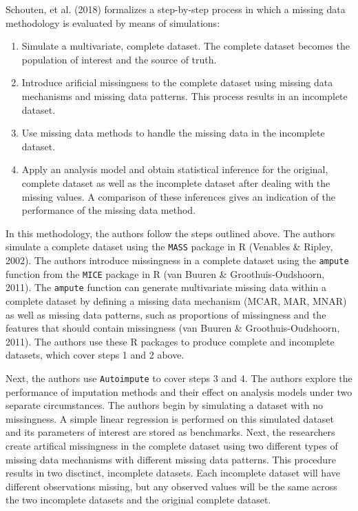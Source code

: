 \documentclass[12pt,oneside]{chicagocapstone}
\providecommand{\tightlist}{%
  \setlength{\itemsep}{0pt}\setlength{\parskip}{0pt}}
\begin{document}
Schouten, et al. (2018) formalizes a step-by-step process in which a
missing data methodology is evaluated by means of simulations:
\begin{enumerate}
\def\labelenumi{\arabic{enumi}.}
\tightlist
\item
  Simulate a multivariate, complete dataset. The complete dataset
  becomes the population of interest and the source of truth.
\item
  Introduce arificial missingness to the complete dataset using missing
  data mechanisms and missing data patterns. This process results in an
  incomplete dataset.
\item
  Use missing data methods to handle the missing data in the incomplete
  dataset.
\item
  Apply an analysis model and obtain statistical inference for the
  original, complete dataset as well as the incomplete dataset after
  dealing with the missing values. A comparison of these inferences
  gives an indication of the performance of the missing data method.
\end{enumerate}
In this methodology, the authors follow the steps outlined above. The
authors simulate a complete dataset using the \texttt{MASS} package in R
(Venables \& Ripley, 2002). The authors introduce missingness in a
complete dataset using the \texttt{ampute} function from the
\texttt{MICE} package in R (van Buuren \& Groothuis-Oudshoorn, 2011).
The \texttt{ampute} function can generate multivariate missing data
within a complete dataset by defining a missing data mechanism (MCAR,
MAR, MNAR) as well as missing data patterns, such as proportions of
missingness and the features that should contain missingness (van Buuren
\& Groothuis-Oudshoorn, 2011). The authors use these R packages to
produce complete and incomplete datasets, which cover steps 1 and 2
above.

Next, the authors use \texttt{Autoimpute} to cover steps 3 and 4. The
authors explore the performance of imputation methods and their effect
on analysis models under two separate circumstances. The authors begin
by simulating a dataset with no missingness. A simple linear regression
is performed on this simulated dataset and its parameters of interest
are stored as benchmarks. Next, the researchers create artifical
missingness in the complete dataset using two different types of missing
data mechanisms with different missing data patterns. This procedure
results in two disctinct, incomplete datasets. Each incomplete dataset
will have different observations missing, but any observed values will
be the same across the two incomplete datasets and the original complete
dataset.
\end{document}

